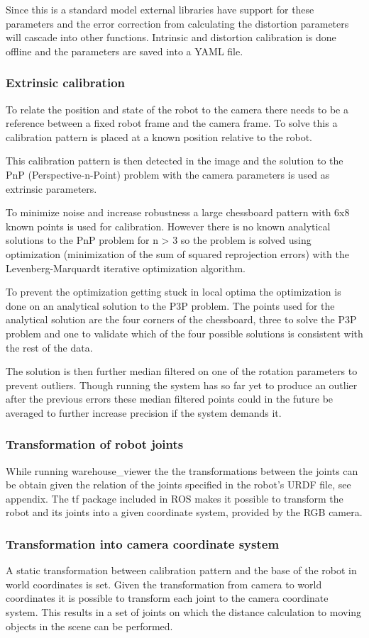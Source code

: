 Since this is a standard model external libraries have support for these parameters and the error correction from calculating the distortion parameters will cascade into other functions. Intrinsic and distortion calibration is done offline and the parameters are saved into a YAML file.

\subsubsection{Extrinsic calibration}
To relate the position and state of the robot to the camera there needs to be a reference between a fixed robot frame and the camera frame. To solve this a calibration pattern is placed at a known position relative to the robot.

This calibration pattern is then detected in the image and the solution to the PnP (Perspective-n-Point) problem with the camera parameters is used as extrinsic parameters.

To minimize noise and increase robustness a large chessboard pattern with 6x8 known points is used for calibration. However there is no known analytical solutions to the PnP problem for n > 3 so the problem is solved using optimization (minimization of the sum of squared reprojection errors) with the Levenberg-Marquardt iterative optimization algorithm.

To prevent the optimization getting stuck in local optima the optimization is done on an analytical solution to the P3P problem. The points used for the analytical solution are the four corners of the chessboard, three to solve the P3P problem and one to validate which of the four possible solutions is consistent with the rest of the data.

The solution is then further median filtered on one of the rotation parameters to prevent outliers. Though running the system has so far yet to produce an outlier after the previous errors these median filtered points could in the future be averaged to further increase precision if the system demands it.

\subsubsection{Transformation of robot joints}
While running warehouse\_viewer the the transformations between the joints can be obtain given the relation of the joints specified in the robot’s URDF file, see appendix. The tf package included in ROS makes it possible to transform the robot and its joints into a given coordinate system, provided by the RGB camera.

\subsubsection{Transformation into camera coordinate system}
A static transformation between calibration pattern and the base of the robot in world coordinates is set. Given the transformation from camera to world coordinates it is possible to transform each joint to the camera coordinate system. This results in a set of joints on which the distance calculation to moving objects in the scene can be performed. 
